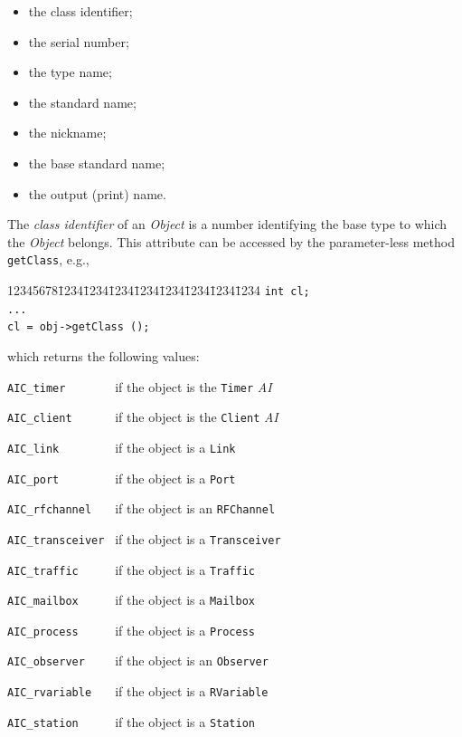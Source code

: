 \begin{itemize}
\item
the class identifier;
\item
the serial number;
\item
the type name;
\item
the standard name;
\item
the nickname;
\item
the base standard name;
\item
the output (print) name.
\end{itemize}

The {\em class identifier\/} of an {\em Object\/} is a number
identifying the base {\smurph}
type to which the {\em Object\/} belongs.
This attribute can be accessed by the parameter-less method
{\tt getClass}, e.g.,
{\tt\begin{tabbing}
12345678\=1234\=1234\=1234\=1234\=1234\=1234\=1234\=1234\kill
\> {\tt int  cl;}\\
\> {\tt ...}\\
\> {\tt cl = obj->getClass ();}
\end{tabbing}}
\noindent
which returns the following values:

\bigskip

\noindent
{\tt AIC\_timer~~~~~~~} if the object is the {\tt Timer} {\em AI}

\noindent
{\tt AIC\_client~~~~~~} if the object is the {\tt Client} {\em AI}

\noindent
{\tt AIC\_link~~~~~~~~} if the object is a {\tt Link}

\noindent
{\tt AIC\_port~~~~~~~~} if the object is a {\tt Port}

\noindent
{\tt AIC\_rfchannel~~~} if the object is an {\tt RFChannel}

\noindent
{\tt AIC\_transceiver~} if the object is a {\tt Transceiver}

\noindent
{\tt AIC\_traffic~~~~~} if the object is a {\tt Traffic}

\noindent
{\tt AIC\_mailbox~~~~~} if the object is a {\tt Mailbox}

\noindent
{\tt AIC\_process~~~~~} if the object is a {\tt Process}

\noindent
{\tt AIC\_observer~~~~} if the object is an {\tt Observer}

\noindent
{\tt AIC\_rvariable~~~} if the object is a {\tt RVariable}

\noindent
{\tt AIC\_station~~~~~} if the object is a {\tt Station}

